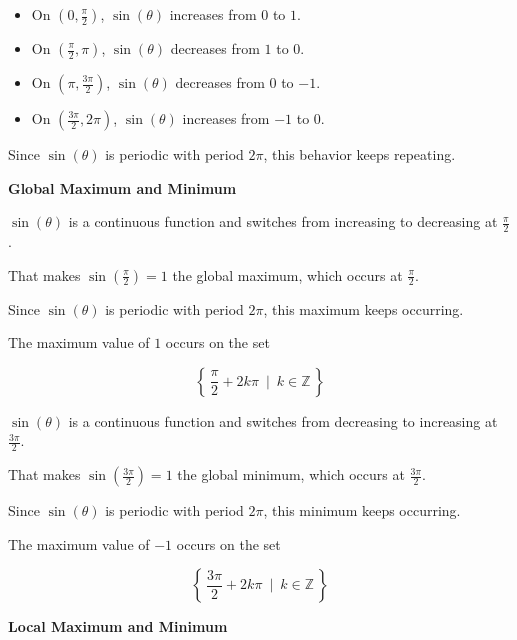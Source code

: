 \documentclass{ximera}
\begin{document}
\begin{itemize}
\item On $\left( 0, \frac{\pi}{2} \right)$, $\sin(\theta)$ increases from $0$ to $1$.
\item On $\left( \frac{\pi}{2}, \pi \right)$, $\sin(\theta)$ decreases from $1$ to $0$.
\item On $\left( \pi, \frac{3\pi}{2} \right)$, $\sin(\theta)$ decreases from $0$ to $-1$.
\item On $\left( \frac{3\pi}{2}, 2\pi \right)$, $\sin(\theta)$ increases from $-1$ to $0$.
\end{itemize}


Since $\sin(\theta)$ is periodic with period $2\pi$, this behavior keeps repeating.





\textbf{\textcolor{blue!55!black}{Global Maximum and Minimum}}



$\sin(\theta)$ is a continuous function and switches from increasing to decreasing at $\frac{\pi}{2}$.  


That makes $\sin\left( \frac{\pi}{2} \right) = 1$ the global maximum, which occurs at $\frac{\pi}{2}$.


Since $\sin(\theta)$ is periodic with period $2\pi$, this maximum keeps occurring.


The maximum value of $1$ occurs on the set 

\[
\left\{ \, \frac{\pi}{2} + 2k \pi \, \text{ | } \,  k \in \mathbb{Z} \,  \right\}
\]







$\sin(\theta)$ is a continuous function and switches from decreasing to increasing at $\frac{3\pi}{2}$.  


That makes $\sin\left( \frac{3\pi}{2} \right) = 1$ the global minimum, which occurs at $\frac{3\pi}{2}$.




Since $\sin(\theta)$ is periodic with period $2\pi$, this minimum keeps occurring.


The maximum value of $-1$ occurs on the set 

\[
\left\{ \, \frac{3\pi}{2} + 2k \pi \, \text{ | } \,  k \in \mathbb{Z} \,  \right\}
\]








\textbf{\textcolor{blue!55!black}{Local Maximum and Minimum}}
\end{document}
